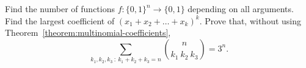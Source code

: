 \begin{chapterendexercises}
    Find the number of functions $f : \{0, 1\}^n \to \{0, 1\}$ depending on all
    arguments.
  \exercise Find the largest coefficient of $(x_1 + x_2 + \dots + x_k)^k$.
  \exercise Prove that,
    without using Theorem~\ref{theorem:multinomial-coefficients},
    \[
      \sum_{k_1, k_2, k_3 ~:~ k_1 + k_2 + k_3 = n} \binom{n}{k_1 \ k_2 \ k_3} =
      3^n.
    \]
\end{chapterendexercises}
